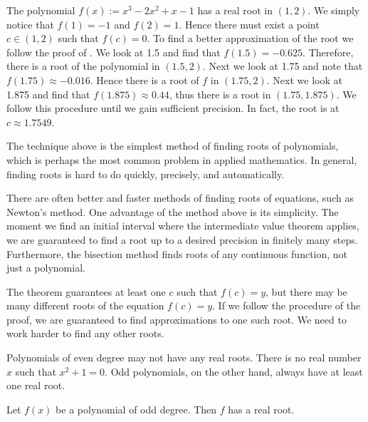 \begin{example} %
The polynomial $f(x) := x^3-2x^2+x-1$ has a real root in $(1,2)$.  We simply
notice that $f(1) = -1$ and $f(2) = 1$.  Hence there must exist a point $c
\in (1,2)$ such that $f(c) = 0$.  To find a better approximation of
the root we follow the proof of .  
We look at 1.5 and find that $f(1.5) = -0.625$.  Therefore,
there is a root of the polynomial in $(1.5,2)$.  Next we look at 1.75
and note that $f(1.75) \approx -0.016$.  Hence there is a root of $f$ in
$(1.75,2)$.  Next we look at 1.875 and find that $f(1.875) \approx 0.44$,
thus there is a root in $(1.75,1.875)$.  We follow this procedure until we gain
sufficient precision.  In fact, the root is at $c \approx 1.7549$.
\end{example}

The technique above is the simplest method of finding roots of polynomials,
which is perhaps the most common problem in applied
mathematics.  In general, finding roots is hard to do quickly, precisely,
and automatically.

There are often better and faster methods of finding roots of equations, such
as Newton's method.  One advantage of the method above is its
simplicity.  The
moment we find an initial interval where the intermediate value theorem
applies, we are guaranteed to find a root up to a desired
precision in finitely many steps.  Furthermore, the bisection
method finds
roots of any
continuous function, not just a polynomial.

The theorem guarantees at least one $c$ such that $f(c) = y$, but there
may be many different roots of the equation $f(c) = y$.  If we follow
the procedure of the proof, we are guaranteed to find approximations to
one such root.  We need to work harder to find any other roots.

\medskip

Polynomials of even degree may not have any real roots.
There is no real number $x$ such that $x^2+1 = 0$.  Odd polynomials, on the
other hand, always have at least one real root.

\begin{prop}
Let $f(x)$ be a polynomial of odd degree.  Then $f$ has a real root.
\end{prop}


